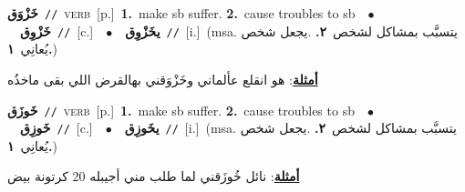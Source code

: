 \documentclass[10pt,a4paper,twoside]{article} %
\begin{document}
\begin{multicols}{2}
{\setlength\topsep{0pt}\textbf{\foreignlanguage{arabic}{خَزْوَق}}\ {\color{gray}\texttt{//}\color{black}}\ \textsc{verb}\ [p.]\ \textbf{1.}~make sb suffer.  \textbf{2.}~cause troubles to sb\ \ $\bullet$\ \ \setlength\topsep{0pt}\textbf{\foreignlanguage{arabic}{خَزْوِق}}\ {\color{gray}\texttt{//}\color{black}}\ [c.]\ \ $\bullet$\ \ \setlength\topsep{0pt}\textbf{\foreignlanguage{arabic}{يخَزْوِق}}\ {\color{gray}\texttt{//}\color{black}}\ [i.]\ \color{gray}(msa. \foreignlanguage{arabic}{يتسبَّب بمشاكل لشخص}~\foreignlanguage{arabic}{\textbf{٢.}}  .\foreignlanguage{arabic}{يجعل شخص يُعانِي}~\foreignlanguage{arabic}{\textbf{١.}})\color{black}\  \begin{flushright}\color{gray}\foreignlanguage{arabic}{\textbf{\underline{\foreignlanguage{arabic}{أمثلة}}}: هو انقلع عألماني وخَزْوَقني بهالقرض اللي بقى ماخذُه}\end{flushright}\color{black}} \vspace{2mm}

{\setlength\topsep{0pt}\textbf{\foreignlanguage{arabic}{خَوزَق}}\ {\color{gray}\texttt{//}\color{black}}\ \textsc{verb}\ [p.]\ \textbf{1.}~make sb suffer.  \textbf{2.}~cause troubles to sb\ \ $\bullet$\ \ \setlength\topsep{0pt}\textbf{\foreignlanguage{arabic}{خَوزِق}}\ {\color{gray}\texttt{//}\color{black}}\ [c.]\ \ $\bullet$\ \ \setlength\topsep{0pt}\textbf{\foreignlanguage{arabic}{يخَوزِق}}\ {\color{gray}\texttt{//}\color{black}}\ [i.]\ \color{gray}(msa. \foreignlanguage{arabic}{يتسبَّب بمشاكل لشخص}~\foreignlanguage{arabic}{\textbf{٢.}}  .\foreignlanguage{arabic}{يجعل شخص يُعانِي}~\foreignlanguage{arabic}{\textbf{١.}})\color{black}\  \begin{flushright}\color{gray}\foreignlanguage{arabic}{\textbf{\underline{\foreignlanguage{arabic}{أمثلة}}}: نائل خُوزَقني لما طلب مني أجيبله 20 كرتونة بيض}\end{flushright}\color{black}} \vspace{2mm}


\end{multicols}
\end{document}
